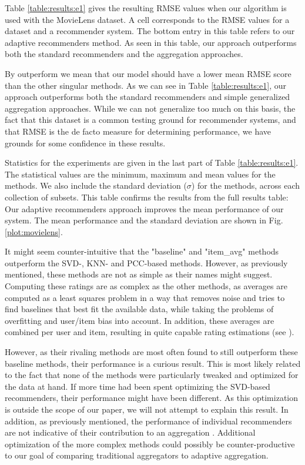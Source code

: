 Table \ref{table:results:e1} gives the resulting RMSE values when our algorithm is used with the MovieLens dataset.
A cell corresponds to the RMSE values for a dataset and a recommender system.
The bottom entry in this table refers to our adaptive recommenders method.
As seen in this table, our approach outperforms both the standard recommenders
and the aggregation approaches.

By outperform we mean that our model should have a lower
mean RMSE score than the other singular methods. As we can see in Table \ref{table:results:e1},
our approach outperforms both the standard recommenders
and simple generalized aggregation approaches.
While we can not generalize too much on this basis, 
the fact that this dataset is a common testing ground for recommender systems,
and that RMSE is the de facto measure for determining performance,
we have grounds for some confidence in these results.



Statistics for the experiments are given in the last
part of Table \ref{table:results:e1}. 
The statistical values are the minimum, maximum and mean values
for the methods. We also include
the standard deviation ($\sigma$) for the methods,
across each collection of subsets.
This table confirms the results from the full results table:
Our adaptive recommenders approach improves the mean performance
of our system.
The mean performance and the standard deviation
are shown in Fig. \ref{plot:movielens}.


%

It might seem counter-intuitive that the "baseline" and "item\_avg" methods outperform
the SVD-, KNN- and PCC-based methods. However, as previously mentioned, these methods are not 
as simple as their names might suggest. Computing these ratings are as complex
as the other methods, as averages are computed as a least squares problem in a way that
removes noise and tries to find baselines that best fit the available data,
while taking the problems of overfitting and user/item bias into account.
In addition, these averages are combined per user and item, resulting
in quite capable rating estimations (see \cite[p.2]{Koren2008}).

However, as their rivaling methods are most often found to still outperform these baseline methods,
their performance is a curious result. This is most likely related
to the fact that none of the methods were particularly tweaked and optimized for 
the data at hand. If more time had been spent optimizing the SVD-based recommenders,
their performance might have been different. 
As this optimization is outside the scope of our paper, we will not attempt to explain this result.
In addition, as previously mentioned, 
the performance of individual recommenders are not indicative of their
contribution to an aggregation \cite[p.6]{Bell2007b}.
Additional optimization of the more complex methods could possibly be counter-productive
to our goal of comparing traditional aggregators to adaptive aggregation.


